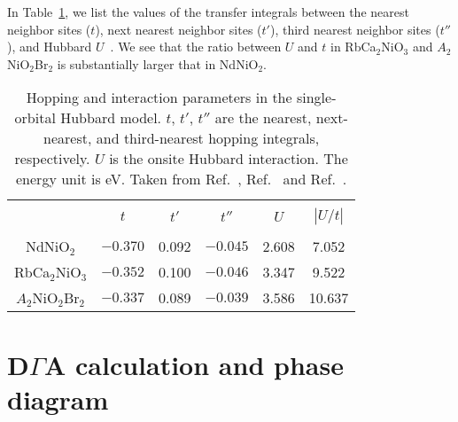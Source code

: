 \documentclass[%
 aip,
 amsmath,amssymb,
 reprint,%
]{revtex4-1}
\begin{document}
In Table~\ref{model}, we list the values of the transfer integrals between the nearest neighbor sites ($t$), next nearest neighbor sites ($t'$), third nearest neighbor sites ($t''$), and Hubbard $U$~\cite{Nomura_2019,Hirayama_2020, Nomura_2020}. We see that the ratio between $U$ and $t$ in RbCa$_2$NiO$_3$ and $A_2$NiO$_2$Br$_2$ is substantially larger that in NdNiO$_2$.

\begin{table} 
\caption{
Hopping and interaction parameters in the single-orbital Hubbard model. 
$t$, $t'$, $t''$ are the nearest, next-nearest, and third-nearest hopping integrals, respectively. 
$U$ is the onsite Hubbard interaction. 
The energy unit is eV.
Taken from Ref.~, Ref.~ and Ref.~.
} 
\vspace{0.2cm}
\begin{tabular}{@{\ \ \ \ }c@{\ \ \ \ \ \ \ }c@{\ \ \ \ \ }c@{\ \ \ \ \ }c@{\ \ \ \ \ }c@{\ \ \ \ \ }c}
\hline \hline \\ [-8pt]   
 & $t$  & $t'$ & $t''$ & $U$ & $|U/t|$   \\ [+1pt]
\hline \\ [-8pt] 
NdNiO$_2$       & $-0.370$ & 0.092 & $-0.045$ & 2.608  & 7.052  \\ [+1pt]
RbCa$_2$NiO$_3$ & $-0.352$ & 0.100 & $-0.046$ & 3.347 & 9.522  \\ [+1pt]
$A_2$NiO$_2$Br$_2$ & $-0.337$  &  0.089 &  $-0.039$ & 3.586 & 10.637   \\ [+1pt]
\hline \hline 
\end{tabular}
\label{model} 
\end{table}

\section{D$\Gamma$A calculation and phase diagram\label{sec:4}}
\end{document}
